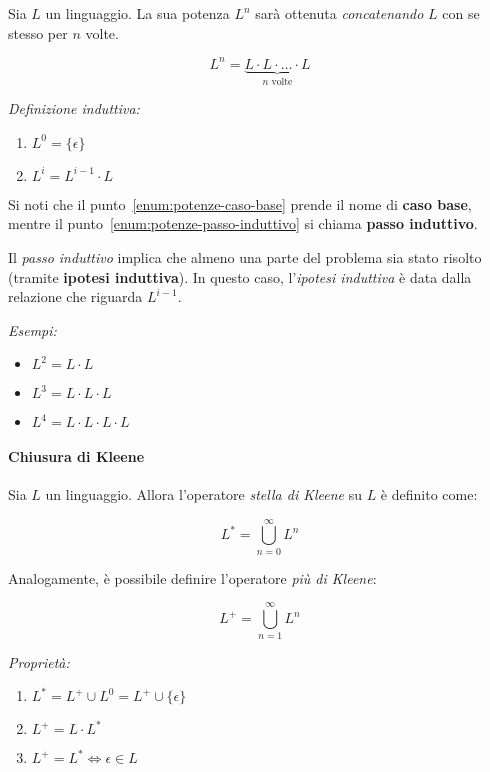 \documentclass[italian, 10pt]{article}
\begin{document}
Sia \(L\) un linguaggio. La sua potenza \(L^n\) sarà ottenuta \textit{concatenando} \(L\) con se stesso per \(n\) volte.

\[ \displaystyle L^n = \underbrace{L \cdot L \cdot \ldots \cdot L}_{n \text{ volte}} \]

\bigskip
\textit{Definizione induttiva:}
\begin{enumerate}
  \item \(L^0 = \{\epsilon\}\) \label{enum:potenze-caso-base}
  \item \(L^i = L^{i-1} \cdot L\) \label{enum:potenze-passo-induttivo}
\end{enumerate}

Si noti che il punto~\ref{enum:potenze-caso-base} prende il nome di \textbf{caso base}, mentre il punto~\ref{enum:potenze-passo-induttivo} si chiama \textbf{passo induttivo}.

Il \textit{passo induttivo} implica che almeno una parte del problema sia stato risolto (tramite \textbf{ipotesi induttiva}).
In questo caso, l'\textit{ipotesi induttiva} è data dalla relazione che riguarda \(L^{i-1}\).

\bigskip
\textit{Esempi:}
\begin{itemize}
  \item \(L^2 = L \cdot L\)
  \item \(L^3 = L \cdot L \cdot L\)
  \item \(L^4 = L \cdot L \cdot L \cdot L\)
\end{itemize}

\paragraph{Chiusura di Kleene}
\label{sec:proprieta-Kleene}

Sia \(L\) un linguaggio.
Allora l'operatore \textit{stella di Kleene} su \(L\) è definito come:

\[ L^\ast = \bigcup_{n=0}^{\infty} L^n \]

\bigskip
Analogamente, è possibile definire l'operatore \textit{più di Kleene}:

\[ L^+ = \bigcup_{n=1}^{\infty} L^n \]

\bigskip
\textit{Proprietà:}
\begin{enumerate}
  \item \(L^\ast = L^+ \cup L^0 = L^+ \cup \{\epsilon\}\)
  \item \(L^+ = L \cdot L^\ast\)
  \item \(L^+ = L^\ast \Leftrightarrow \epsilon \in L\)
\end{enumerate}
\end{document}
